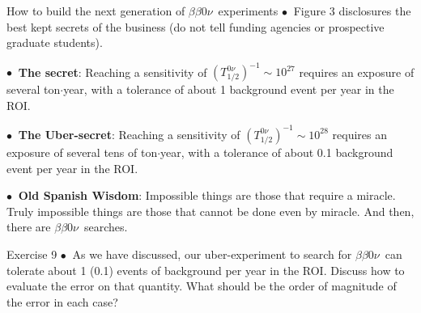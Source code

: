 \documentclass [aspectratio=169]{beamer}
\newcommand{\bbonu}{\ensuremath{\beta\beta0\nu}}
\newcommand{\tonu}{\ensuremath{(T_{1/2}^{0\nu})^{-1}}}
\begin{document}
\begin{frame}{How to build the next generation of \bbonu\ experiments}
$\bullet~$ Figure 3 disclosures the best kept secrets of the business (do not tell funding agencies or prospective graduate students).
 
 $\bullet~$ {\bf The secret}: Reaching a sensitivity of $\tonu \sim 10^{27}$ requires an exposure of several ton$\cdot$year, with a tolerance of about 1 background event per year in the ROI.
 
 $\bullet~$ {\bf The Uber-secret}: Reaching a sensitivity of $\tonu \sim 10^{28}$ requires an exposure of several tens of ton$\cdot$year, with a tolerance of about 0.1 background event per year in the ROI.
 
 $\bullet~$ {\bf Old Spanish Wisdom}: Impossible things are those that require a miracle. Truly impossible things are those that cannot be done even by miracle. And then, there are \bbonu\ searches.
 
 \end{frame}
 
 \begin{frame}{Exercise 9}
$\bullet~$ As we have discussed, our uber-experiment to search for \bbonu\ can tolerate about 1 (0.1) events of background per year in the ROI. Discuss how to evaluate the error on that quantity. What should be the order of magnitude of the error in each case?
\end{frame}
 
\end{document}
